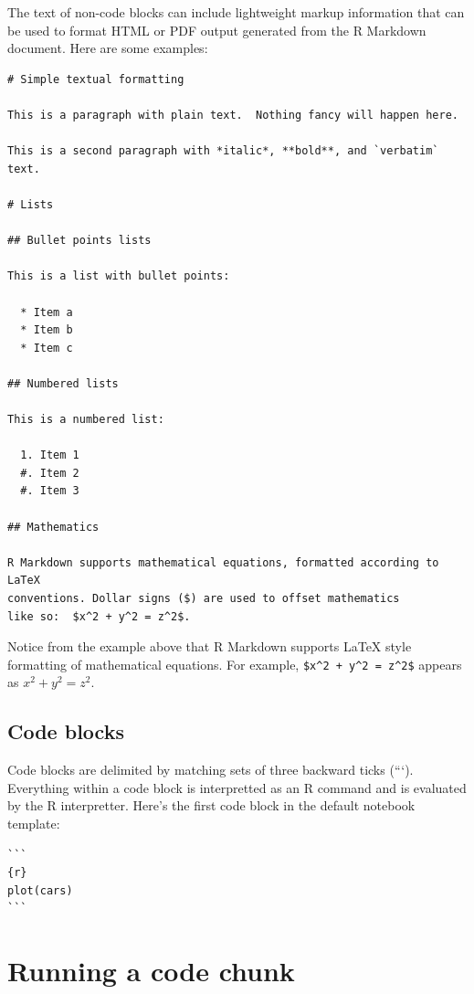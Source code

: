 \documentclass[]{book}
\theoremstyle{definition}
\theoremstyle{definition}
\theoremstyle{definition}
\theoremstyle{remark}
\begin{document}
The text of non-code blocks can include lightweight markup information
that can be used to format HTML or PDF output generated from the R
Markdown document. Here are some examples:

\begin{verbatim}
# Simple textual formatting 

This is a paragraph with plain text.  Nothing fancy will happen here.

This is a second paragraph with *italic*, **bold**, and `verbatim` text. 

# Lists

## Bullet points lists

This is a list with bullet points:

  * Item a
  * Item b
  * Item c

## Numbered lists
  
This is a numbered list:

  1. Item 1
  #. Item 2
  #. Item 3
  
## Mathematics

R Markdown supports mathematical equations, formatted according to LaTeX
conventions. Dollar signs ($) are used to offset mathematics 
like so:  $x^2 + y^2 = z^2$.
\end{verbatim}

Notice from the example above that R Markdown supports LaTeX style
formatting of mathematical equations. For example,
\texttt{\$x\^{}2\ +\ y\^{}2\ =\ z\^{}2\$} appears as
\(x^2 + y^2 = z^2\).

\hypertarget{code-blocks}{%
\subsection{Code blocks}\label{code-blocks}}

Code blocks are delimited by matching sets of three backward ticks
(```). Everything within a code block is interpretted as an R command
and is evaluated by the R interpretter. Here's the first code block in
the default notebook template:

\begin{verbatim}
```
{r}
plot(cars)
```
\end{verbatim}

\hypertarget{running-a-code-chunk}{%
\section{Running a code chunk}\label{running-a-code-chunk}}
\end{document}
